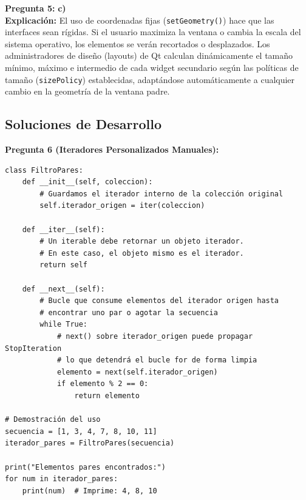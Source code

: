 \documentclass[12pt,letterpaper]{article}
\begin{document}
\medskip

\textbf{Pregunta 5:} \textbf{c)} \\
\textbf{Explicación:} El uso de coordenadas fijas (\texttt{setGeometry()}) hace que las interfaces sean rígidas. Si el usuario maximiza la ventana o cambia la escala del sistema operativo, los elementos se verán recortados o desplazados. Los administradores de diseño (layouts) de Qt calculan dinámicamente el tamaño mínimo, máximo e intermedio de cada widget secundario según las políticas de tamaño (\texttt{sizePolicy}) establecidas, adaptándose automáticamente a cualquier cambio en la geometría de la ventana padre.

\pagebreak

\subsection*{Soluciones de Desarrollo}

\textbf{Pregunta 6 (Iteradores Personalizados Manuales):}
\begin{verbatim}
class FiltroPares:
    def __init__(self, coleccion):
        # Guardamos el iterador interno de la colección original
        self.iterador_origen = iter(coleccion)

    def __iter__(self):
        # Un iterable debe retornar un objeto iterador.
        # En este caso, el objeto mismo es el iterador.
        return self

    def __next__(self):
        # Bucle que consume elementos del iterador origen hasta 
        # encontrar uno par o agotar la secuencia
        while True:
            # next() sobre iterador_origen puede propagar StopIteration
            # lo que detendrá el bucle for de forma limpia
            elemento = next(self.iterador_origen)
            if elemento % 2 == 0:
                return elemento
                
# Demostración del uso
secuencia = [1, 3, 4, 7, 8, 10, 11]
iterador_pares = FiltroPares(secuencia)

print("Elementos pares encontrados:")
for num in iterador_pares:
    print(num)  # Imprime: 4, 8, 10
\end{verbatim}

\bigskip
\end{document}
